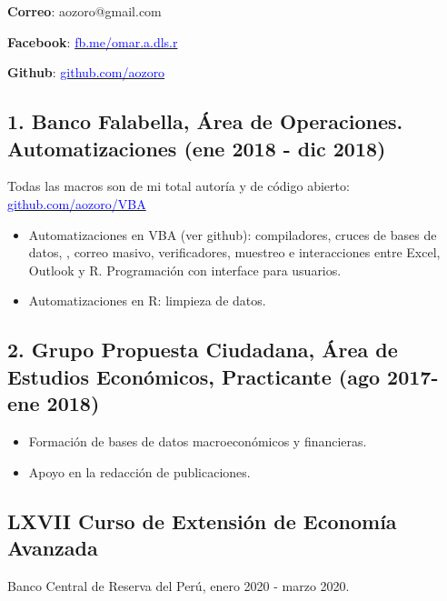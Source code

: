 

{\bfseries Correo}: aozoro@gmail.com 

{\bfseries Facebook}: \href{https://fb.me/omar.a.dls.r}{\textcolor{Blue}{fb.me/omar.a.dls.r}}

{\bfseries Github}: \href{https://github.com/aozoro}{\textcolor{Blue}{github.com/aozoro}}



\subsection*{1. Banco Falabella, Área de Operaciones. Automatizaciones (ene 2018 - dic 2018)}

\vspace{0.2cm}
Todas las macros son de mi total autoría y de código abierto: \href{https://github.com/aozoro/VBA}{\textcolor{Blue}{github.com/aozoro/VBA}}


\begin{itemize}
    \item Automatizaciones en VBA (ver github): compiladores, cruces de bases de datos, , correo masivo, verificadores, muestreo e interacciones entre Excel, Outlook y R. Programación con interface para usuarios.
    
    \item Automatizaciones en R: limpieza de datos.
\end{itemize}

\subsection*{2. Grupo Propuesta Ciudadana, Área de Estudios Económicos, Practicante (ago 2017- ene 2018)}

\begin{itemize}
    \item Formación de bases de datos macroeconómicos y financieras. 
    \item Apoyo en la redacción de publicaciones.
\end{itemize}

\subsection*{LXVII Curso de Extensión de Economía Avanzada}
Banco Central de Reserva del Perú, enero 2020 - marzo 2020.

